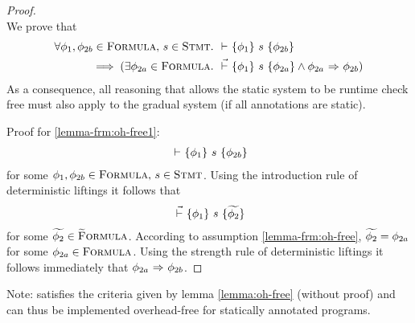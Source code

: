 \begin{proof}~\\
    We prove that 
    \begin{align}
    \begin{split}
    \label{frm:oh-free1}
    \forall \phi_1, \phi_{2b} \in \textup{\textsc{Formula}},\, s \in \textup{\textsc{Stmt}}.~
    &{} \,\,{\vdash}\,\, \{{\phi_1}\} ~{s}~ \{{\phi_{2b}}\} \\
    \implies 
    (\exists \phi_{2a} \in \textup{\textsc{Formula}}.~ &{} \,\,\vec{\vdash}\,\, \{{\phi_1}\} ~{s}~ \{{\phi_{2a}}\} \wedge {\phi_{2a}} \,\,{\Rightarrow}\,\, {\phi_{2b}})
    \end{split}
    \end{align}
    As a consequence, all reasoning that allows the static system to be runtime check free must also apply to the gradual system (if all annotations are static).
    
    Proof for \ref{lemma-frm:oh-free1}:
    \begin{align*}
    {} \,\,{\vdash}\,\, \{{\phi_1}\} ~{s}~ \{{\phi_{2b}}\}
    \end{align*}
    for some $\phi_1, \phi_{2b} \in \textup{\textsc{Formula}},\, s \in \textup{\textsc{Stmt}}$.
    Using the introduction rule of deterministic liftings it follows that
    \begin{align*}
    {} \,\,\vec{\vdash}\,\, \{{\phi_1}\} ~{s}~ \{{\widetilde{\phi_2}}\}
    \end{align*}
    for some $\widetilde{\phi_2} \in \textup{\textsc{\ensuremath{\widetilde{\text{F}}}ormula}}$.
    According to assumption \ref{lemma-frm:oh-free}, $\widetilde{\phi_2} = \phi_{2a}$ for some $\phi_{2a} \in \textup{\textsc{Formula}}$.
    Using the strength rule of deterministic liftings it follows immediately that ${\phi_{2a}} \,\,{\Rightarrow}\,\, {\phi_{2b}}$.

\begin{comment}
    Proof for claim that optimality of $\dgthoare{}{\cdot}{\cdot}{\cdot}$ implies \ref{lemma-frm:oh-free} if \tset{GDPreservation} holds.
    Let $\Phi \defeq \{~ \phi_2 ~|~ \thoare{}{\phi_1}{s}{\phi_2} ~\}$ for some  $\phi_1 \in \setFormula,\, s \in \setStmt$.
    $\Phi$ is the set of all deducible postconditions for given precondition and statement.
    If $\Phi$ is not empty, then the introduction rule of deterministic liftings implies that
    $\dgthoare{}{\phi_1}{s}{\grad{\phi_2}}$ for some $\grad{\phi_2} \in \setGFormula$.
    \begin{description}
        \item[Case 1: $\exists \pi_1, \pi_2.~ \sstepConsume{s}{\pi_1}{\pi_2} \wedge \evalphiGen{\pi_1}{\phi_1}$]~\\
        Due to soundness of the static system, it follows that
        \begin{displaymath}
        \forall \phi_2 \in \Phi.~ \evalphiGen{\pi_2}{\phi_2}
        \end{displaymath}
    \end{description}
    \end{comment}
\end{proof}

Note: \gvlidf satisfies the criteria given by lemma \ref{lemma:oh-free} (without proof) and can thus be implemented overhead-free for statically annotated programs.
